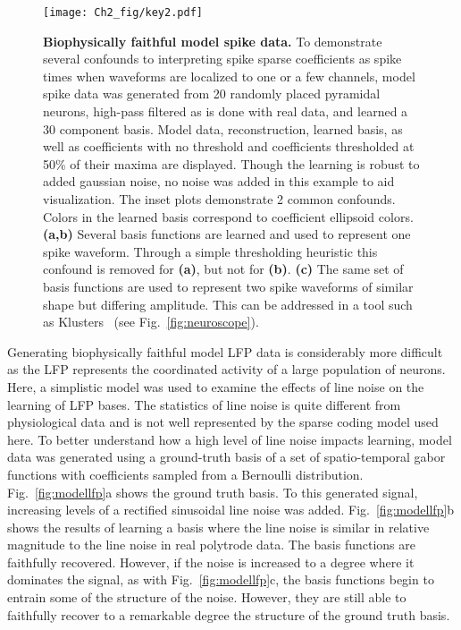 \begin{figure}[htp!]
  \centering
  \texttt{[image: Ch2\_fig/key2.pdf]}
  \caption{\textbf{Biophysically faithful model spike data.} To
    demonstrate several confounds to interpreting spike sparse
    coefficients as spike times when waveforms are localized to one or
    a few channels, model spike data was generated from 20 randomly
    placed pyramidal neurons, high-pass filtered as is done with
    real data, and learned a 30 component basis. Model data,
    reconstruction, learned basis, as well as coefficients with no
    threshold and coefficients thresholded at 50\% of their maxima are
    displayed. Though the learning is robust to added gaussian noise,
    no noise was added in this example to aid visualization. The inset
    plots demonstrate 2 common confounds. Colors in the learned basis
    correspond to coefficient ellipsoid colors. \textbf{(a,b)} Several
    basis functions are learned and used to represent one spike
    waveform. Through a simple thresholding heuristic this confound is
    removed for \textbf{(a)}, but not for \textbf{(b)}. \textbf{(c)}
    The same set of basis functions are used to represent two spike
    waveforms of similar shape but differing amplitude. This can be
    addressed in a tool such as Klusters~\cite{Hazan:2006fk} (see
    Fig.~\ref{fig:neuroscope}).}
  \label{fig:lfpylearning}
\end{figure}

Generating biophysically faithful model LFP data is considerably more
difficult as the LFP represents the coordinated activity of a large
population of neurons. Here, a simplistic model was used to examine
the effects of line noise on the learning of LFP bases. The statistics
of line noise is quite different from physiological data and is not
well represented by the sparse coding model used here. To better
understand how a high level of line noise impacts learning, model data
was generated using a ground-truth basis of a set of spatio-temporal
gabor functions with coefficients sampled from a Bernoulli
distribution. Fig.~\ref{fig:modellfp}a shows the ground truth
basis. To this generated signal, increasing levels of a rectified
sinusoidal line noise was added. Fig.~\ref{fig:modellfp}b shows the
results of learning a basis where the line noise is similar in
relative magnitude to the line noise in real polytrode data. The basis
functions are faithfully recovered. However, if the noise is increased
to a degree where it dominates the signal, as with
Fig.~\ref{fig:modellfp}c, the basis functions begin to entrain some of
the structure of the noise. However, they are still able to faithfully
recover to a remarkable degree the structure of the ground truth
basis.

